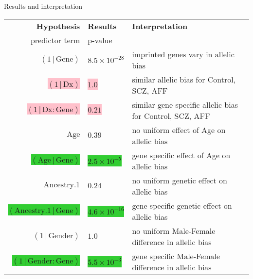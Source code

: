 \documentclass[usenames,dvipsnames]{beamer}
\begin{document}
\begin{frame}[label=results]{Results and interpretation}
\footnotesize
\begin{tabular}{rll}
\hline
\textbf{Hypothesis}                      & \textbf{Results}             & \textbf{Interpretation}                               \\
predictor term                             & p-value                &                                              \\
\hline
\((1\,|\,\mathrm{Gene})\)                   & \(8.5\times 10^{-28}\) & imprinted genes vary in allelic bias     \\
\colorbox{pink}{\((1\,|\,\mathrm{Dx})\)}                     & \colorbox{pink}{\(1.0\)}                & similar allelic bias for Control, SCZ, AFF \\
\colorbox{pink}{\((1\,|\,\mathrm{Dx}:\mathrm{Gene})\)}       & \colorbox{pink}{\(0.21\)}               & similar gene specific allelic bias for Control, SCZ, AFF    \\
\(\mathrm{Age}\)                            & \(0.39\)               & no uniform effect of Age on allelic bias               \\
\colorbox{LimeGreen}{\((\mathrm{Age}\,|\,\mathrm{Gene})\)}        & \colorbox{LimeGreen}{\(2.5\times 10^{-5}\)}  & gene specific effect of Age on allelic bias                \\
\(\mathrm{Ancestry.1}\)                     & \(0.24\)               & no uniform genetic effect on allelic bias               \\
\colorbox{LimeGreen}{\((\mathrm{Ancestry.1}\,|\,\mathrm{Gene})\)} & \colorbox{LimeGreen}{\(4.6\times 10^{-16}\)} & gene specific genetic effect on allelic bias               \\ %
\((1\,|\,\mathrm{Gender})\)                 & \(1.0\)                & no uniform Male-Female difference in allelic bias       \\
\colorbox{LimeGreen}{\((1\,|\,\mathrm{Gender}:\mathrm{Gene})\)}   & \colorbox{LimeGreen}{\(5.5\times 10^{-3}\)}  & gene specific Male-Female difference in allelic bias       \\
\hline
\end{tabular}
\end{frame}
\end{document}
